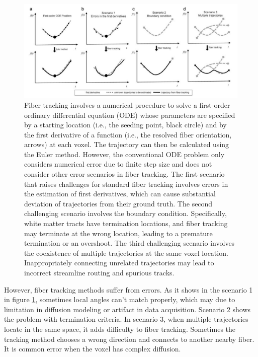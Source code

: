 \begin{figure}[ht]
    \centering
    \includegraphics[width= 13cm]{figures/tracking.png}
        \caption{Fiber tracking involves a numerical procedure to solve a first-order ordinary differential equation (ODE) whose parameters are specified by a starting location (i.e., the seeding point, black circle) 
        and by the first derivative of a function (i.e., the resolved fiber orientation, arrows) at each voxel. 
        The trajectory can then be calculated using the Euler method. 
        However, the conventional ODE problem only considers numerical error due to finite step size and does not consider other error scenarios in fiber tracking. 
        The first scenario that raises challenges for standard fiber tracking involves errors in the estimation of first derivatives, 
        which can cause substantial deviation of trajectories from their ground truth. 
        The second challenging scenario involves the boundary condition. Specifically, white matter tracts have termination locations, and fiber tracking may terminate at the wrong location, 
        leading to a premature termination or an overshoot.
        The third challenging scenario involves the coexistence of multiple trajectories at the same voxel location. 
        Inappropriately connecting unrelated trajectories may lead to incorrect streamline routing and spurious tracks. \cite*[]{yehTractographyMethodsFindings2021}
        }
    \label{fig:tracking}
\end{figure}

However, fiber tracking methods suffer from errors. As it shows in the scenario 1 in figure \ref*{fig:tracking},
sometimes local angles can't match properly, which may due to limitation in diffusion modeling or artifact in data acquisition.
Scenario 2 shows the problem with termination criteria. In scenario 3, when multiple trajectories locate in the same space,
it adds difficulty to fiber tracking. Sometimes the tracking method chooses a wrong direction and connects to another nearby fiber.
It is common error when the voxel has complex diffusion.

